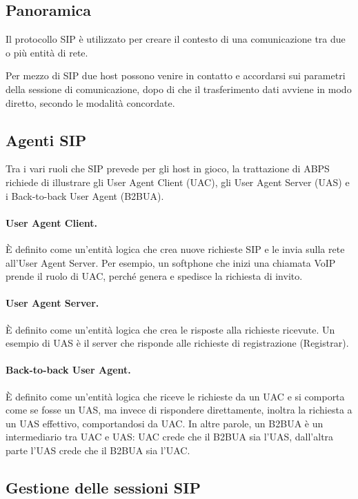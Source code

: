 \documentclass[12pt,a4paper,openright,twoside]{book}
\begin{document}
\subsection{Panoramica}

Il protocollo SIP è utilizzato per creare il contesto di una
comunicazione tra due o più entità di rete.

Per mezzo di SIP due host possono venire in contatto e accordarsi sui
parametri della sessione di comunicazione, dopo di che il
trasferimento dati avviene in modo diretto, secondo le modalità
concordate.

\subsection{Agenti SIP}

Tra i vari ruoli che SIP prevede per gli host in gioco, la trattazione
di ABPS richiede di illustrare gli User Agent Client (UAC), gli User
Agent Server (UAS) e i Back-to-back User Agent (B2BUA).

\paragraph{User Agent Client.}
È definito come un'entità logica che crea nuove richieste SIP e le
invia sulla rete all'User Agent Server. Per esempio, un softphone che
inizi una chiamata VoIP prende il ruolo di UAC, perché genera e
spedisce la richiesta di invito.

\paragraph{User Agent Server.}
È definito come un'entità logica che crea le risposte alla richieste
ricevute. Un esempio di UAS è il server che risponde alle richieste di
registrazione (Registrar).

\paragraph{Back-to-back User Agent.}

È definito come un'entità logica che riceve le richieste da un UAC e
si comporta come se fosse un UAS, ma invece di rispondere
direttamente, inoltra la richiesta a un UAS effettivo, comportandosi
da UAC. In altre parole, un B2BUA è un intermediario tra UAC e UAS:
UAC crede che il B2BUA sia l'UAS, dall'altra parte l'UAS crede che il
B2BUA sia l'UAC.

\subsection{Gestione delle sessioni SIP}
\end{document}

